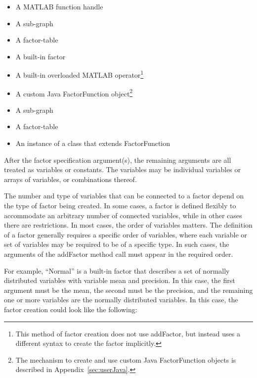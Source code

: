 \ifmatlab

\begin{itemize}
\item A MATLAB function handle
\item A sub-graph
\item A factor-table
\item A built-in factor
\item A built-in overloaded MATLAB operator\footnote{This method of factor creation does not use addFactor, but instead uses a different syntax to create the factor implicitly.}
\item A custom Java FactorFunction object\footnote{The mechanism to create and use custom Java FactorFunction objects is described in Appendix~\ref{sec:userJava}.}
\end{itemize}

\fi

\ifjava

\begin{itemize}
\item A sub-graph
\item A factor-table
\item An instance of a class that extends FactorFunction
\end{itemize}


\fi

After the factor specification argument(s), the remaining arguments are all treated as variables or constants.   \ifmatlab The variables may be individual variables or arrays of variables, or combinations thereof. \fi

The number and type of variables that can be connected to a factor depend on the type of factor being created.  In some cases, a factor is defined flexibly to accommodate an arbitrary number of connected variables, while in other cases there are restrictions.  In most cases, the order of variables matters.  The definition of a factor generally requires a specific order of variables, where each variable or set of variables may be required to be of a specific type.  In such cases, the arguments of the addFactor method call must appear in the required order.

For example, ``Normal'' is a built-in factor that describes a set of normally distributed variables with variable mean and precision.  In this case, the first argument must be the mean, the second must be the precision, and the remaining one or more variables are the normally distributed variables.  In this case, the factor creation could look like the following:

